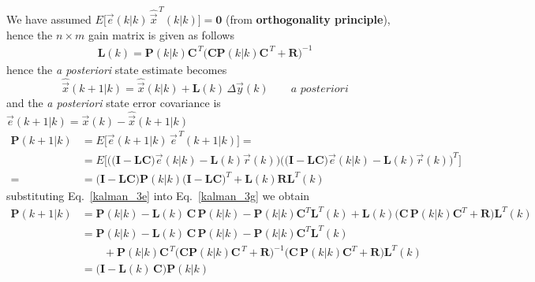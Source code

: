\documentclass[11pt,a4paper,oneside]{book}
\numberwithin{equation}{section}
\theoremstyle{it}
\theoremstyle{definition}
\begin{document}
We have assumed $E\Big[\vec{e}(k|k)\,\hat{\vec{x}}^{\,T}(k|k)\Big]=\mathbf{0}$ 
(from \textbf{orthogonality principle}), hence the $n\times m$ gain matrix is 
given as follows
\begin{equation}\label{kalman_3e}
	\begin{aligned}
		\mathbf{L}(k) = 
		\mathbf{P}(k|k)\mathbf{C}^{\,T}\Big(\mathbf{C}\mathbf{P}(k|k)\mathbf{C}^{\,T}+\mathbf{R}\Big)^{-1}
	\end{aligned}
\end{equation}
hence the \textit{a posteriori} state estimate becomes
\begin{equation}\label{kalman_3f}
	\hat{\vec{x}}\left(k+1|k\right) = \hat{\vec{x}}\left(k|k\right) + 
	\mathbf{L}(k)\, \Delta\vec{y}\left(k\right) \qquad \textit{a posteriori}
\end{equation}
and the \textit{a posteriori} state error covariance is 
$\vec{e}(k+1|k)=\vec{x}(k) - \hat{\vec{x}}(k+1|k)$
\begin{equation}\label{kalman_3g}
	\begin{aligned}
		\mathbf{P}\left(k+1|k\right) &= 
		E\Big[\vec{e}(k+1|k)\,\vec{e}^{\,T}(k+1|k)\Big] = \\[6pt] &= 
		E\Big[\Big(\Big(\mathbf{I}-\mathbf{LC}\Big)\vec{e}(k|k) - 
		\mathbf{L}(k)\vec{r}(k)\Big) 
		\Big(\Big(\mathbf{I}-\mathbf{LC}\Big)\vec{e}(k|k) - 
		\mathbf{L}(k)\vec{r}(k)\Big)^T\Big] \\[6pt] =
		&=  \Big(\mathbf{I}-\mathbf{LC}\Big)\mathbf{P}(k|k) 
		\Big(\mathbf{I}-\mathbf{LC}\Big)^T+\mathbf{L}(k)\mathbf{R}\mathbf{L}^T(k)
	\end{aligned}
\end{equation}
substituting Eq.~\eqref{kalman_3e} into Eq.~\eqref{kalman_3g} we obtain
\begin{equation}\label{kalman_3h}
	\begin{aligned}
		\mathbf{P}\left(k+1|k\right) &= \mathbf{P}\left(k|k\right) - 
		\mathbf{L}(k)\,\mathbf{C}\,\mathbf{P}(k|k) - 
		\mathbf{P}(k|k)\mathbf{C}^T\mathbf{L}^T(k)+\mathbf{L}(k) 
		\Big(\mathbf{C}\,\mathbf{P}(k|k)\mathbf{C}^T+ 
		\mathbf{R}\Big)\mathbf{L}^T(k)	 \\[6pt]
		&= \mathbf{P}\left(k|k\right) - 
		\mathbf{L}(k)\,\mathbf{C}\,\mathbf{P}(k|k) - 
		\mathbf{P}(k|k)\mathbf{C}^T\mathbf{L}^T(k) \\[6pt]
		& \qquad+\mathbf{P}(k|k)\mathbf{C}^{\,T} \Big(\mathbf{C} 
		\mathbf{P}(k|k)\mathbf{C}^{\,T}+ \mathbf{R}\Big)^{-1}
		\Big(\mathbf{C}\, \mathbf{P}(k|k)\mathbf{C}^T 
		+\mathbf{R}\Big)\mathbf{L}^T(k)  \\[6pt]
		& = \Big(\mathbf{I}-\mathbf{L}(k)\,\mathbf{C} \Big) 
		\mathbf{P}\left(k|k\right)
	\end{aligned}
\end{equation}
\end{document}
